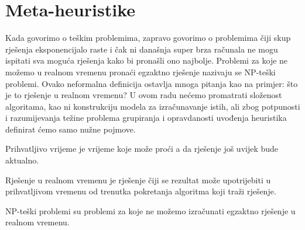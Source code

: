 \documentclass[a4paper,twoside,12pt]{memoir} %
\begin{document}
\section[Meta-heuristike][Meta-heuristike]{Meta-heuristike}
Kada govorimo o teškim problemima, zapravo govorimo o problemima čiji skup rješenja eksponencijalo raste i čak ni današnja super brza računala ne mogu ispitati sva moguća rješenja kako bi pronašli ono najbolje. Problemi za koje ne možemo u realnom vremenu pronaći egzaktno rješenje nazivaju se NP-teški problemi. Ovako neformalna definicija ostavlja mnoga pitanja kao na primjer: što je to rješenje u realnom vremenu? U ovom radu nećemo promatrati složenost algoritama, kao ni konstrukciju modela za izračunavanje istih, ali zbog potpunosti i razumijevanja težine problema grupiranja i opravdanosti uvođenja heuristika definirat ćemo samo nužne pojmove.
\begin{defn}
Prihvatljivo vrijeme je vrijeme koje može proći a da rješenje još uvijek bude aktualno.
\end{defn}
\begin{defn}
Rješenje u realnom vremenu je rješenje čiji se rezultat može upotrijebiti u prihvatljivom vremenu od trenutka pokretanja algoritma koji traži rješenje.
\end{defn}
\begin{defn}
NP-teški problemi su problemi za koje ne možemo izračunati egzaktno rješenje u realnom vremenu.
\end{defn}
\end{document}
